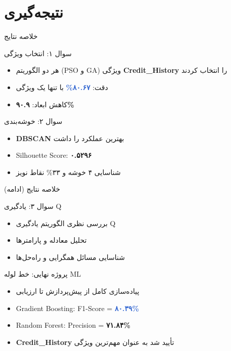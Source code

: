 \documentclass[aspectratio=169]{beamer}
\begin{document}
\section{نتیجه‌گیری}

\begin{frame}{خلاصه نتایج}
\begin{block}{سوال ۱: انتخاب ویژگی}
\begin{itemize}
\item هر دو الگوریتم (PSO و GA) ویژگی \textcolor{important}{\textbf{Credit\_History}} را انتخاب کردند
\item دقت: \textcolor{highlight}{\textbf{۸۰.۶۷\%}} با تنها یک ویژگی
\item کاهش ابعاد: \textcolor{success}{\textbf{۹۰.۹\%}}
\end{itemize}
\end{block}

\begin{block}{سوال ۲: خوشه‌بندی}
\begin{itemize}
\item \textcolor{success}{\textbf{DBSCAN}} بهترین عملکرد را داشت
\item Silhouette Score: \textcolor{important}{\textbf{۰.۵۲۹۶}}
\item شناسایی ۴ خوشه و ۳۳\% نقاط نویز
\end{itemize}
\end{block}
\end{frame}

\begin{frame}{خلاصه نتایج (ادامه)}
\begin{block}{سوال ۳: یادگیری Q}
\begin{itemize}
\item بررسی نظری الگوریتم یادگیری Q
\item تحلیل معادله و پارامترها
\item شناسایی مسائل همگرایی و راه‌حل‌ها
\end{itemize}
\end{block}

\begin{block}{پروژه نهایی: خط لوله ML}
\begin{itemize}
\item پیاده‌سازی کامل از پیش‌پردازش تا ارزیابی
\item Gradient Boosting: F1-Score = \textcolor{highlight}{\textbf{۸۰.۳۹\%}}
\item Random Forest: Precision = \textcolor{important}{\textbf{۷۱.۸۴\%}}
\item \textcolor{success}{\textbf{Credit\_History}} تأیید شد به عنوان مهم‌ترین ویژگی
\end{itemize}
\end{block}
\end{frame}
\end{document}
